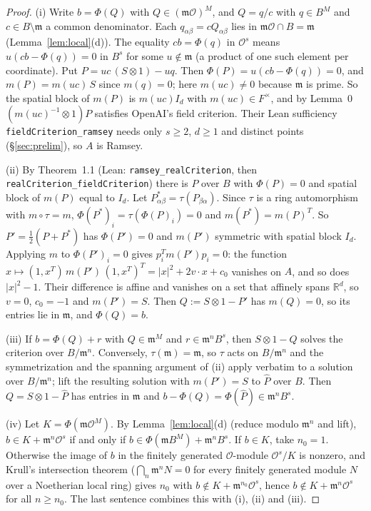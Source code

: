 \documentclass[11pt]{amsart}
\newcommand{\R}{\mathbb{R}}
\theoremstyle{plain}
\theoremstyle{definition}
\begin{document}
\begin{proof}
(i) Write $b=\Phi(Q)$ with $Q\in(\mathfrak m\mathcal O)^M$, and $Q=q/c$ with $q\in B^M$ and
$c\in B\setminus\mathfrak m$ a common denominator. Each $q_{\alpha\beta}=cQ_{\alpha\beta}$ lies in
$\mathfrak m\mathcal O\cap B=\mathfrak m$ (Lemma~\ref{lem:local}(d)). The equality $cb=\Phi(q)$ in
$\mathcal O^s$ means $u(cb-\Phi(q))=0$ in $B^s$ for some $u\notin\mathfrak m$ (a product of one such element
per coordinate). Put $P=uc\,(S\otimes1)-uq$. Then $\Phi(P)=u(cb-\Phi(q))=0$, and $m(P)=m(uc)\,S$ since
$m(q)=0$; here $m(uc)\ne0$ because $\mathfrak m$ is prime. So the spatial block of $m(P)$ is $m(uc)I_d$ with
$m(uc)\in F^\times$, and by Lemma~0 $(m(uc)^{-1}\otimes1)P$ satisfies OpenAI's field criterion. Their Lean
sufficiency \texttt{fieldCriterion\_\allowbreak{}ramsey} needs only $s\ge2$, $d\ge1$ and distinct points
(\S\ref{sec:prelim}), so $A$ is Ramsey.

(ii) By Theorem~1.1 (Lean: \texttt{ramsey\_\allowbreak{}realCriterion}, then
\texttt{realCriterion\_\allowbreak{}fieldCriterion}) there is $P$ over $B$ with $\Phi(P)=0$ and spatial
block of $m(P)$ equal to $I_d$. Let $P^*_{\alpha\beta}=\tau(P_{\beta\alpha})$. Since $\tau$ is a ring
automorphism with $m\circ\tau=m$, $\Phi(P^*)_i=\tau(\Phi(P)_i)=0$ and $m(P^*)=m(P)^T$. So
$P'=\tfrac12(P+P^*)$ has $\Phi(P')=0$ and $m(P')$ symmetric with spatial block $I_d$. Applying $m$ to
$\Phi(P')_i=0$ gives $p_i^Tm(P')p_i=0$: the function $x\mapsto(1,x^T)\,m(P')\,(1,x^T)^T=|x|^2+2v\cdot x+c_0$
vanishes on $A$, and so does $|x|^2-1$. Their difference is affine and vanishes on a set that affinely
spans $\R^d$, so $v=0$, $c_0=-1$ and $m(P')=S$. Then $Q:=S\otimes1-P'$ has $m(Q)=0$, so its entries lie in
$\mathfrak m$, and $\Phi(Q)=b$.

(iii) If $b=\Phi(Q)+r$ with $Q\in\mathfrak m^M$ and $r\in\mathfrak m^nB^s$, then $S\otimes1-Q$ solves the
criterion over $B/\mathfrak m^n$. Conversely, $\tau(\mathfrak m)=\mathfrak m$, so $\tau$ acts on
$B/\mathfrak m^n$ and the symmetrization and the spanning argument of (ii) apply verbatim to a solution
over $B/\mathfrak m^n$; lift the resulting solution with $m(P')=S$ to $\hat P$ over $B$. Then
$Q=S\otimes1-\hat P$ has entries in $\mathfrak m$ and $b-\Phi(Q)=\Phi(\hat P)\in\mathfrak m^nB^s$.

(iv) Let $K=\Phi(\mathfrak m\mathcal O^M)$. By Lemma~\ref{lem:local}(d) (reduce modulo $\mathfrak m^n$ and
lift), $b\in K+\mathfrak m^n\mathcal O^s$ if and only if $b\in\Phi(\mathfrak mB^M)+\mathfrak m^nB^s$. If
$b\in K$, take $n_0=1$. Otherwise the image of $b$ in the finitely generated $\mathcal O$-module
$\mathcal O^s/K$ is nonzero, and Krull's intersection theorem ($\bigcap_n\mathfrak m^nN=0$ for every finitely
generated module $N$ over a Noetherian local ring) gives $n_0$ with $b\notin K+\mathfrak m^{n_0}\mathcal O^s$,
hence $b\notin K+\mathfrak m^n\mathcal O^s$ for all $n\ge n_0$. The last sentence combines this with (i),
(ii) and (iii).
\end{proof}
\end{document}
